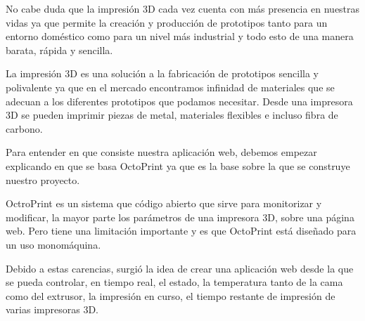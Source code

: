 
No cabe duda que la impresión 3D cada vez cuenta con más presencia en nuestras vidas ya que permite la creación y producción de prototipos tanto para un entorno doméstico como para un nivel más industrial y todo esto de una manera barata, rápida y sencilla.

La impresión 3D es una solución a la fabricación de prototipos sencilla y polivalente ya que en el mercado encontramos infinidad de materiales que se adecuan a los diferentes prototipos que podamos necesitar. Desde una impresora 3D se pueden imprimir piezas de metal, materiales flexibles e incluso fibra de carbono.

Para entender en que consiste nuestra aplicación web, debemos empezar explicando en que se basa OctoPrint ya que es la base sobre la que se construye nuestro proyecto.

OctroPrint es un sistema que código abierto que sirve para monitorizar y modificar, la mayor parte los parámetros de una impresora 3D, sobre una página web. Pero tiene una limitación importante y es que OctoPrint está diseñado para un uso monomáquina.

Debido a estas carencias, surgió la idea de crear una aplicación web desde la que se pueda controlar, en tiempo real, el estado, la temperatura tanto de la cama como del extrusor, la impresión en curso, el tiempo restante de impresión de varias impresoras 3D. 

